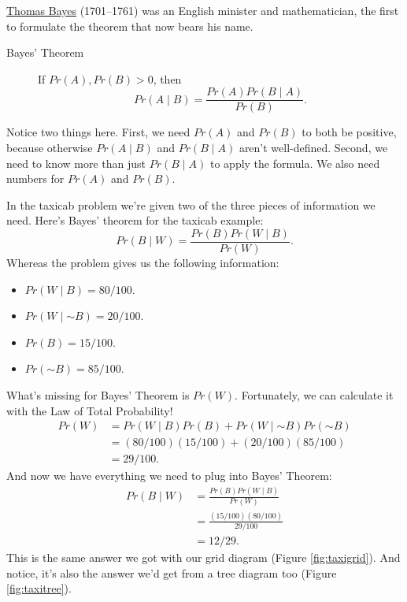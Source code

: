 \documentclass[justified]{tufte-book}
\providecommand{\tightlist}{%
  \setlength{\itemsep}{0pt}\setlength{\parskip}{0pt}}
\newcommand{\given}{\mid}
\renewcommand{\neg}{\mathbin{\sim}}
\newcommand{\p}{Pr}
\theoremstyle{definition}
\theoremstyle{definition}
\theoremstyle{definition}
\theoremstyle{definition}
\theoremstyle{remark}
\begin{document}
\begin{marginfigure}
\href{https://en.wikipedia.org/wiki/Thomas_Bayes}{Thomas Bayes}
(1701--1761) was an English minister and mathematician, the first to
formulate the theorem that now bears his name.
\end{marginfigure}

\begin{description}
\item[Bayes' Theorem]
If \(\p(A),\p(B)>0\), then
\[ \p(A \given B) = \frac{\p(A)\p(B \given A)}{\p(B)}. \]
\end{description}

Notice two things here. First, we need \(\p(A)\) and \(\p(B)\) to both be positive, because otherwise \(\p(A \given B)\) and \(\p(B \given A)\) aren't well-defined. Second, we need to know more than just \(\p(B \given A)\) to apply the formula. We also need numbers for \(\p(A)\) and \(\p(B)\).

In the taxicab problem we're given two of the three pieces of information we need. Here's Bayes' theorem for the taxicab example:
\[ \p(B \given W) = \frac{\p(B) \p(W \given B)}{\p(W)}. \]
Whereas the problem gives us the following information:

\begin{itemize}
\tightlist
\item
  \(\p(W \given B) = 80/100\).
\item
  \(\p(W \given \neg B) = 20/100\).
\item
  \(\p(B) = 15/100\).
\item
  \(\p(\neg B) = 85/100\).
\end{itemize}

What's missing for Bayes' Theorem is \(\p(W)\). Fortunately, we can calculate it with the Law of Total Probability!
\[
  \begin{aligned}
    \p(W) &= \p(W \given B)\p(B) + \p(W \given \neg B)\p(\neg B)\\
          &= (80/100)(15/100) + (20/100)(85/100)\\
          &= 29/100.
  \end{aligned}
\]
And now we have everything we need to plug into Bayes' Theorem:
\[
  \begin{aligned}
    \p(B \given W) &= \frac{\p(B) \p(W \given B)}{\p(W)}\\
                   &= \frac{(15/100)(80/100)}{29/100}\\
                   &= 12/29.
  \end{aligned}
\]
This is the same answer we got with our grid diagram (Figure \ref{fig:taxigrid}). And notice, it's also the answer we'd get from a tree diagram too (Figure \ref{fig:taxitree}).
\end{document}
